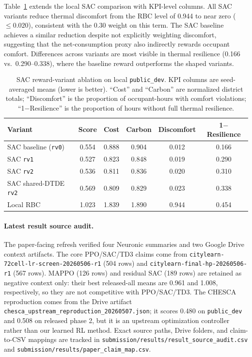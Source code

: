 \documentclass{article}
\begin{document}
Table~\ref{tab:sac_ablation} extends the local SAC comparison with KPI-level columns. All SAC variants reduce thermal discomfort from the RBC level of 0.944 to near zero ($\leq 0.020$), consistent with the 0.30 weight on this term. The SAC baseline achieves a similar reduction despite not explicitly weighting discomfort, suggesting that the net-consumption proxy also indirectly rewards occupant comfort. Differences across variants are most visible in thermal resilience (0.166 vs.\ 0.290--0.338), where the baseline reward outperforms the shaped variants.

\begin{table}[h]
\centering
\small
\begin{tabular}{lccccc}
\toprule
\textbf{Variant} & \textbf{Score} & \textbf{Cost} & \textbf{Carbon} & \textbf{Discomfort} & \textbf{1$-$Resilience} \\
\midrule
SAC baseline (\texttt{rv0}) & 0.554 & 0.888 & 0.904 & 0.012 & 0.166 \\
SAC \texttt{rv1}            & 0.527 & 0.823 & 0.848 & 0.019 & 0.290 \\
SAC \texttt{rv2}            & 0.536 & 0.811 & 0.836 & 0.020 & 0.310 \\
SAC shared-DTDE \texttt{rv2} & 0.569 & 0.809 & 0.829 & 0.023 & 0.338 \\
\midrule
Local RBC                   & 1.023 & 1.839 & 1.890 & 0.944 & 0.454 \\
\bottomrule
\end{tabular}
\caption{SAC reward-variant ablation on local \texttt{public\_dev}. KPI columns are seed-averaged means (lower is better). ``Cost'' and ``Carbon'' are normalized district totals; ``Discomfort'' is the proportion of occupant-hours with comfort violations; ``1$-$Resilience'' is the proportion of hours without full thermal resilience.}
\label{tab:sac_ablation}
\end{table}

\paragraph{Latest result source audit.}
The paper-facing refresh verified four Neuronic summaries and two Google Drive context artifacts. The core PPO/SAC/TD3 claims come from \texttt{citylearn-72cell-lr-screen-20260506-r1} (504 rows) and \texttt{citylearn-final-hp-20260506-r1} (567 rows). MAPPO (126 rows) and residual SAC (189 rows) are retained as negative context only: their best released-all means are 0.961 and 1.008, respectively, so they are not competitive with PPO/SAC/TD3. The CHESCA reproduction comes from the Drive artifact \texttt{chesca\_upstream\_reproduction\_20260507.json}; it scores 0.480 on \texttt{public\_dev} and 0.508 on released phase 2, but it is an upstream optimization controller rather than our learned RL method. Exact source paths, Drive folders, and claim-to-CSV mappings are tracked in \texttt{submission/results/result\_source\_audit.csv} and \texttt{submission/results/paper\_claim\_map.csv}.
\end{document}
